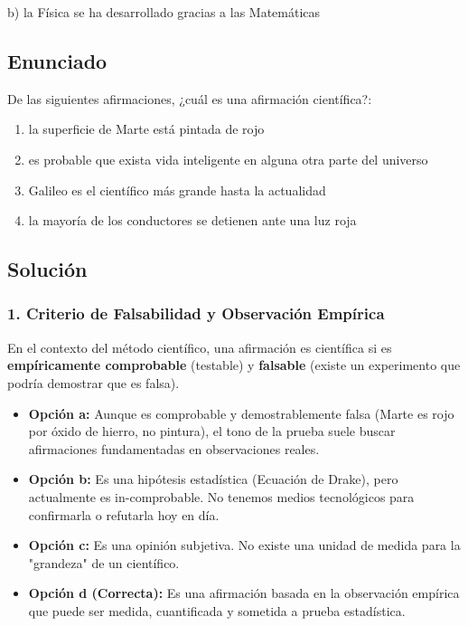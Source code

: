 \documentclass[12pt, a4paper]{article}
\begin{document}
\begin{tcolorbox}[colback=green!5!white, colframe=green!50!black, title=Respuesta Final]
\centering \Large b) la Física se ha desarrollado gracias a las Matemáticas
\end{tcolorbox}

\newpage


\subsection*{Enunciado}
De las siguientes afirmaciones, ¿cuál es una afirmación científica?:
\begin{enumerate}[label=\alph*)]
    \item la superficie de Marte está pintada de rojo
    \item es probable que exista vida inteligente en alguna otra parte del universo
    \item Galileo es el científico más grande hasta la actualidad
    \item la mayoría de los conductores se detienen ante una luz roja
\end{enumerate}

\subsection*{Solución}

\subsubsection*{1. Criterio de Falsabilidad y Observación Empírica}
En el contexto del método científico, una afirmación es científica si es \textbf{empíricamente comprobable} (testable) y \textbf{falsable} (existe un experimento que podría demostrar que es falsa).
\begin{itemize}
    \item \textbf{Opción a:} Aunque es comprobable y demostrablemente falsa (Marte es rojo por óxido de hierro, no pintura), el tono de la prueba suele buscar afirmaciones fundamentadas en observaciones reales.
    \item \textbf{Opción b:} Es una hipótesis estadística (Ecuación de Drake), pero actualmente es in-comprobable. No tenemos medios tecnológicos para confirmarla o refutarla hoy en día.
    \item \textbf{Opción c:} Es una opinión subjetiva. No existe una unidad de medida para la "grandeza" de un científico.
    \item \textbf{Opción d (Correcta):} Es una afirmación basada en la observación empírica que puede ser medida, cuantificada y sometida a prueba estadística. 
\end{itemize}
\end{document}
